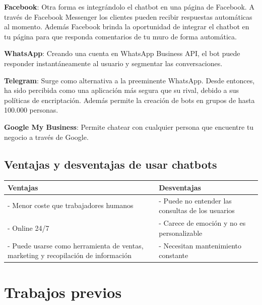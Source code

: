 {{\textbf{Facebook}: Otra forma es integrándolo el chatbot en una página de Facebook. A través de Facebook Messenger los clientes pueden recibir respuestas automáticas al momento. Además Facebook brinda la oportunidad de integrar el chatbot en tu página para que responda comentarios de tu muro de forma automática.\vspace{0.3cm}

\textbf{WhatsApp}: Creando una cuenta en WhatsApp Business API, el bot puede responder instantáneamente al usuario y segmentar las conversaciones. \vspace{0.3cm}

\textbf{Telegram}: Surge como alternativa a la preeminente WhatsApp. Desde entonces, ha sido percibida como una aplicación más segura que su rival, debido a sus políticas de encriptación. Además permite la creación de bots en grupos de hasta 100.000 personas.\vspace{0.3cm}

\textbf{Google My Business}: Permite chatear con cualquier persona que encuentre tu negocio a través de Google.




\subsection{Ventajas y desventajas de usar chatbots}
{\vspace{0.5cm}

\begin{table}[!ht]
\begin{center}
\begin{tabular}{| p{6cm} | p{7cm} |}
\hline
\rowcolor{blueice}
\textbf{Ventajas} & \textbf{Desventajas} \\
 \hline
- Menor coste que trabajadores humanos & - Puede no entender las consultas de los usuarios \\
- Online 24/7 & - Carece de emoción y no es personalizable \\
- Puede usarse como herramienta de ventas, marketing y recopilación de información & - Necesitan mantenimiento constante \\ \hline
\end{tabular}
\end{center}
\end{table}



\section{Trabajos previos}

}}}
